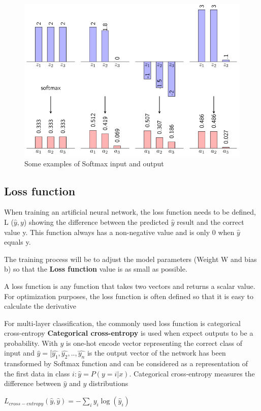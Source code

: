 \begin{center}
	\begin{figure}[H]
		\centering
		\includegraphics[width=0.75\columnwidth]{images/chap2/Softmax.png}
		\caption{Some examples of Softmax input and output}
		\label{chap2:softmax}
	\end{figure}
\end{center}
\vspace{-1cm}
\subsection{Loss function}
When training an artificial neural network, the loss function needs to be defined, L ($\hat{y}, y$) showing the difference between the predicted $\hat{y}$ result and the correct value y. This function always has a non-negative value and is only 0 when $\hat{y}$ equals y.

The training process will be to adjust the model parameters (Weight W and bias b) so that the \textbf{Loss function} value is as small as possible.

A loss function is any function that takes two vectors and returns a scalar value. For optimization purposes, the loss function is often defined so that it is easy to calculate the derivative

For multi-layer classification, the commonly used loss function is categorical cross-entropy
\textbf{Categorical cross-entropy} is used when expect outputs to be a probability.
With $y$ is one-hot encode vector representing the correct class of input and $\hat{y} = [\hat{y_1},\hat{y_2},..,\hat{y_n}$ is the output vector of the network has been transformed by Softmax function and can be considered as a representation of the first data in class $i: \hat{y} = P(y = i|x)$. Categorical cross-entropy measures the difference between $\hat{y}$ and $y$ distributions
\begin{center}
	$L_{cross-entropy}(\hat{y},\hat{y}) = - \sum\limits_{i}y_{i}\log(\hat{y}_{i})$
\end{center}
